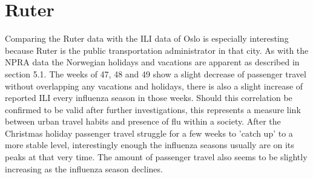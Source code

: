 \section{Ruter}
Comparing the Ruter data with the ILI data of Oslo is especially interesting because Ruter is the public transportation administrator in that city. As with the NPRA data the Norwegian holidays and vacations are apparent as described in section 5.1. The weeks of 47, 48 and 49 show a slight decrease of passenger travel without overlapping any vacations and holidays, there is also a slight increase of reported ILI every influenza season in those weeks. Should this correlation be confirmed to be valid after further investigations, this represents a measure link between urban travel habits and presence of flu within a society.
After the Christmas holiday passenger travel struggle for a few weeks to 'catch up' to a more stable level, interestingly enough the influenza seasons usually are on its peaks at that very time.
The amount of passenger travel also seems to be slightly increasing as the influenza season declines.















